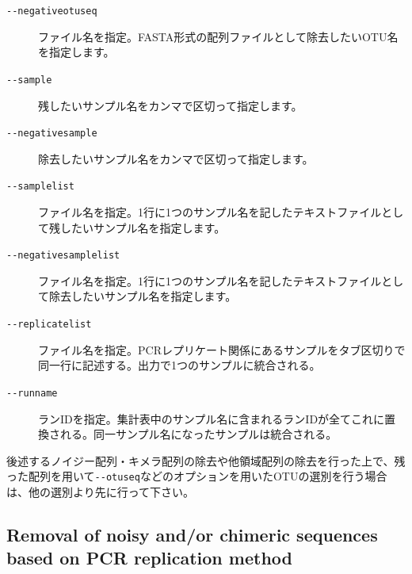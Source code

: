 \documentclass[titlepage,10pt,a4paper,english]{jsbook}
\begin{document}
\begin{description}
\item[\texttt{{-}{-}negativeotuseq}] ファイル名を指定。FASTA形式の配列ファイルとして除去したいOTU名を指定します。
\item[\texttt{{-}{-}sample}] 残したいサンプル名をカンマで区切って指定します。
\item[\texttt{{-}{-}negativesample}] 除去したいサンプル名をカンマで区切って指定します。
\item[\texttt{{-}{-}samplelist}] ファイル名を指定。1行に1つのサンプル名を記したテキストファイルとして残したいサンプル名を指定します。
\item[\texttt{{-}{-}negativesamplelist}] ファイル名を指定。1行に1つのサンプル名を記したテキストファイルとして除去したいサンプル名を指定します。
\item[\texttt{{-}{-}replicatelist}] ファイル名を指定。PCRレプリケート関係にあるサンプルをタブ区切りで同一行に記述する。出力で1つのサンプルに統合される。
\item[\texttt{{-}{-}runname}] ランIDを指定。集計表中のサンプル名に含まれるランIDが全てこれに置換される。同一サンプル名になったサンプルは統合される。
\end{description}

後述するノイジー配列・キメラ配列の除去や他領域配列の除去を行った上で、残った配列を用いて\texttt{{-}{-}otuseq}などのオプションを用いたOTUの選別を行う場合は、他の選別より先に行って下さい。

\subsection{Removal of noisy and/or chimeric sequences based on PCR replication method}
\end{document}
